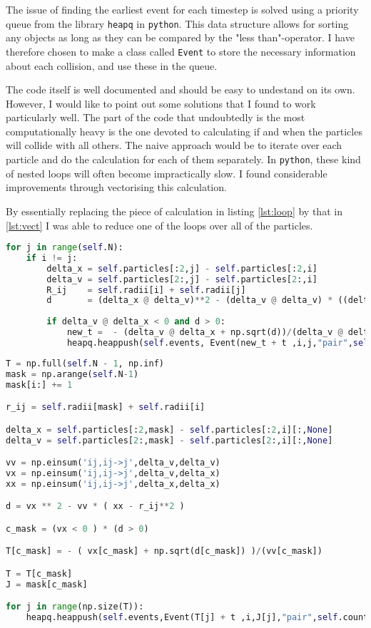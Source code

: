 The issue of finding the earliest event for each timestep is solved using a priority queue from the library \texttt{heapq} in \texttt{python}. This data structure allows for sorting any objects as long as they can be compared by the "less than"-operator. I have therefore chosen to make a class called \texttt{Event} to store the necessary information about each collision, and use these in the queue.  

The code itself is well documented and should be easy to undestand on its own. However, I would like to point out some solutions that I found to work particularly well. The part of the code that undoubtedly is the most computationally heavy is the one devoted to calculating if and when the particles will collide with all others. The naive approach would be to iterate over each particle and do the calculation for each of them separately. In \texttt{python}, these kind of nested loops will often become impractically slow. I found considerable improvements through vectorising this calculation. 

By essentially replacing the piece of calculation in listing \ref{lst:loop} by that in \ref{lst:vect} I was able to reduce one of the loops over all of the particles.

\begin{lstlisting}[language=Python,caption= Loop over all particles.,label={lst:loop}]
for j in range(self.N):
	if i != j:
		delta_x = self.particles[:2,j] - self.particles[:2,i]
		delta_v = self.particles[2:,j] - self.particles[2:,i]
		R_ij    = self.radii[i] + self.radii[j]
		d       = (delta_x @ delta_v)**2 - (delta_v @ delta_v) * ((delta_x @ delta_x) - R_ij**2)
		
		if delta_v @ delta_x < 0 and d > 0:
			new_t =  - (delta_v @ delta_x + np.sqrt(d))/(delta_v @ delta_v)
			heapq.heappush(self.events, Event(new_t + t ,i,j,"pair",self.count[i], self.count[j]))
\end{lstlisting}

\begin{lstlisting}[language=Python, caption= Vectorized calculation., label={lst:vect}]
T = np.full(self.N - 1, np.inf)
mask = np.arange(self.N-1)
mask[i:] += 1

r_ij = self.radii[mask] + self.radii[i]

delta_x = self.particles[:2,mask] - self.particles[:2,i][:,None]
delta_v = self.particles[2:,mask] - self.particles[2:,i][:,None]

vv = np.einsum('ij,ij->j',delta_v,delta_v)
vx = np.einsum('ij,ij->j',delta_v,delta_x)
xx = np.einsum('ij,ij->j',delta_x,delta_x)

d = vx ** 2 - vv * ( xx - r_ij**2 )

c_mask = (vx < 0 ) * (d > 0)

T[c_mask] = - ( vx[c_mask] + np.sqrt(d[c_mask]) )/(vv[c_mask])

T = T[c_mask]
J = mask[c_mask]

for j in range(np.size(T)):
	heapq.heappush(self.events,Event(T[j] + t ,i,J[j],"pair",self.count[i], self.count[J[j]]))
\end{lstlisting}

